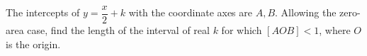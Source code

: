 The intercepts of $y=\dfrac{x}{2}+k$ with the coordinate axes are $A,B$. Allowing the zero-area case, find the length of the interval of real $k$ for which $[AOB]<1$, where $O$ is the origin.

